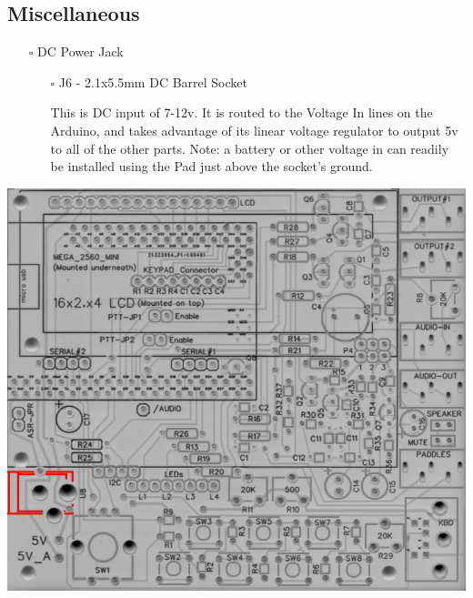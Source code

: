 \documentclass[11pt]{article}
\begin{document}
\newpage
\subsection{Miscellaneous}
\label{sec:org16cabf3}
\begin{itemize}
\item[{$\square$}] DC Power Jack
\begin{itemize}
\item[{$\square$}] J6 - 2.1x5.5mm DC Barrel Socket

This is DC input of 7-12v.  It is routed to the Voltage In lines on the Arduino, and takes advantage of its linear voltage regulator to output 5v to all of the other parts.  Note:  a battery or other voltage in can readily be installed using the Pad just above the socket's ground.
\end{itemize}
\end{itemize}
\begin{center}
\includegraphics[width=.9\linewidth]{../png/3.5/pcb-top-dc-power-jack.png}
\end{center}
\end{document}
